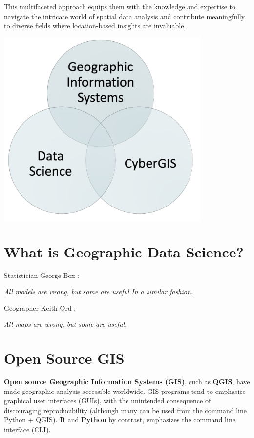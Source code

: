 \documentclass[
  letterpaper,
  DIV=11,
  numbers=noendperiod]{scrreprt}
\begin{document}
This multifaceted approach equips them with the knowledge and expertise
to navigate the intricate world of spatial data analysis and contribute
meaningfully to diverse fields where location-based insights are
invaluable.

\includegraphics[width=0.8\textwidth,height=\textheight]{./img/gds.png}

\section*{What is Geographic Data
Science?}\label{what-is-geographic-data-science}


Statistician George Box :

\emph{All models are wrong, but some are useful In a similar fashion.}

Geographer Keith Ord :

\emph{All maps are wrong, but some are useful.}

\section*{Open Source GIS}\label{open-source-gis}


\textbf{Open source Geographic Information Systems (GIS)}, such as
\textbf{QGIS}, have made geographic analysis accessible worldwide. GIS
programs tend to emphasize graphical user interfaces (GUIs), with the
unintended consequence of discouraging reproducibility (although many
can be used from the command line Python + QGIS). \textbf{R} and
\textbf{Python} by contrast, emphasizes the command line interface
(CLI).
\end{document}
